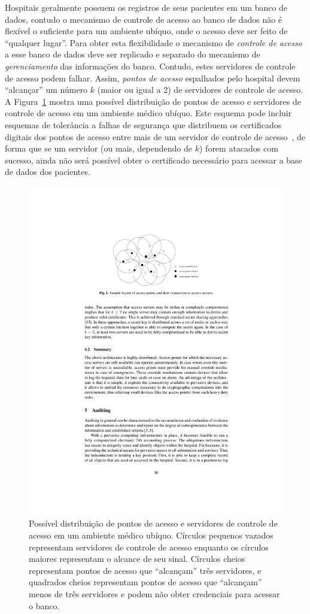 Hospitais geralmente possuem os registros de seus pacientes em um banco de dados, contudo o mecanismo de controle de acesso ao banco de dados não é flexível o suficiente para um ambiente ubíquo, onde o acesso deve ser feito de ``qualquer lugar''. Para obter esta flexibilidade o mecanismo de \emph{controle de acesso} a esse banco de dados deve ser replicado e separado do mecanismo de \emph{gerenciamento} das informações do banco. Contudo, estes servidores de controle de acesso podem falhar. Assim, \emph{pontos de acesso} espalhados pelo hospital devem ``alcançar'' um número $k$ (maior ou igual a 2) de servidores de controle de acesso. A Figura~\ref{fig:pervasive_hospital1} mostra uma possível distribuição de pontos de acesso e servidores de controle de acesso em um ambiente médico ubíquo. Este esquema pode incluir esquemas de tolerância a falhas de segurança que distribuem os certificados digitais dos pontos de acesso entre mais de um servidor de controle de acesso~\cite{rabin1989efficient}, de forma que se um servidor (ou mais, dependendo de $k$) forem atacados com sucesso, ainda não será possível obter o certificado necessário para acessar a base de dados dos pacientes.

\begin{figure}[htbp]
	\centering
		\includegraphics[width=.6\textwidth]{figuras/pervasive_hospital1.pdf}
	\caption{Possível distribuição de pontos de acesso e servidores de controle de acesso em um ambiente médico ubíquo. Círculos pequenos vazados representam servidores de controle de acesso enquanto os círculos maiores representam o alcance de seu sinal. Círculos cheios representam pontos de acesso que ``alcançam'' três servidores, e quadrados cheios representam pontos de acesso que ``alcançam'' menos de três servidores e podem não obter credenciais para acessar o banco.}
	\label{fig:pervasive_hospital1}
\end{figure}

